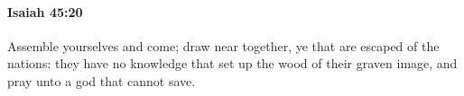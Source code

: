 
		\paragraph{Isaiah 45:20} %
			\label{ISAIAH-45-20}

			Assemble yourselves and come; draw near together, ye that are escaped of the nations: they have no knowledge that set up the wood of their graven image, and pray unto a god that cannot save.


